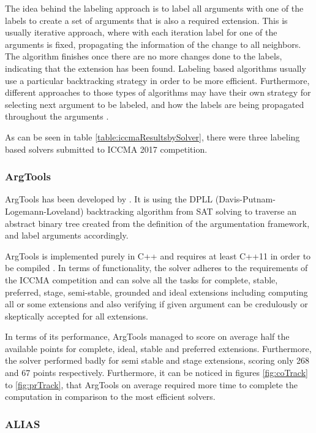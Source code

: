The idea behind the labeling approach is to label all arguments with one of the labels to create a set of arguments that is also a required extension. This is usually iterative approach, where with each iteration label for one of the arguments is fixed, propagating the information of the change to all neighbors. The algorithm finishes once there are no more changes done to the labels, indicating that the extension has been found. Labeling based algorithms usually use a particular backtracking strategy in order to be more efficient. Furthermore, different approaches to those types of algorithms may have their own strategy for selecting next argument to be labeled, and how the labels are being propagated throughout the arguments \citep{solvingMethods}.

As can be seen in table \ref{table:iccmaResultsbySolver}, there were three labeling based solvers submitted to ICCMA 2017 competition. 

\subsubsection{ArgTools}
ArgTools has been developed by \citet{argtools}. It is using the DPLL (Davis-Putnam-Logemann-Loveland) backtracking algorithm from SAT solving \citep{bierehandbook} to traverse an abstract binary tree created from the definition of the argumentation framework, and label arguments accordingly. 
 
ArgTools is implemented purely in C++ and requires at least C++11 in order to be compiled \citep{argtools}. In terms of functionality, the solver adheres to the requirements of the ICCMA competition and can solve all the tasks for complete, stable, preferred, stage, semi-stable, grounded and ideal extensions including computing all or some extensions and also verifying if given argument can be credulously or skeptically accepted for all extensions.

In terms of its performance, ArgTools managed to score on average half the available points for complete, ideal, stable and preferred extensions. Furthermore, the solver performed badly for semi stable and stage extensions, scoring only 268 and 67 points respectively. Furthermore, it can be noticed in figures \ref{fig:coTrack} to \ref{fig:prTrack}, that ArgTools on average required more time to complete the computation in comparison to the most efficient solvers.

\subsubsection{ALIAS}  \label{section:alias}

